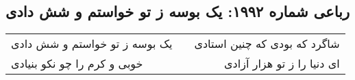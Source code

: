 \begin{center}
\section*{رباعی شماره ۱۹۹۲: یک بوسه ز تو خواستم و شش دادی}
\label{sec:1992}
\begin{longtable}{l p{0.5cm} r}
یک بوسه ز تو خواستم و شش دادی
&&
شاگرد که بودی که چنین استادی
\\
خوبی و کرم را چو نکو بنیادی
&&
ای دنیا را ز تو هزار آزادی
\\
\end{longtable}
\end{center}
